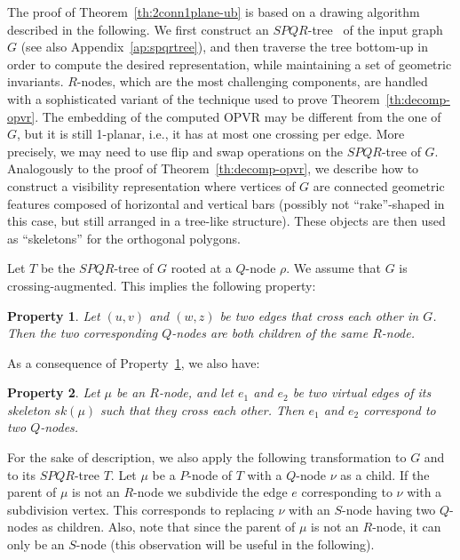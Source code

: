 \documentclass{article}
\newtheorem{property}{Property}
\newcommand{\opvr}{OPVR\xspace}
\begin{document}
The proof of Theorem~\ref{th:2conn1plane-ub} is based on a drawing algorithm described in the following. We first construct an $SPQR$-tree~\cite{DBLP:journals/siamcomp/BattistaT96} of the input graph $G$ (see also Appendix~\ref{ap:spqrtree}), and then traverse  the tree bottom-up in order to compute the desired representation, while maintaining a set of geometric invariants. $R$-nodes, which are the most challenging components, are handled with a sophisticated variant of the technique used to prove Theorem~\ref{th:decomp-opvr}. The embedding of the computed \opvr may be different from the one of $G$, but it is still 1-planar, i.e., it has at most one crossing per edge. More precisely, we may need to use flip and swap operations on the $SPQR$-tree of $G$.  Analogously to  the proof of Theorem~\ref{th:decomp-opvr}, we describe how to construct a visibility representation where vertices of $G$ are connected geometric features composed of horizontal and vertical bars (possibly not ``rake''-shaped in this case, but still arranged in a tree-like structure). These objects are then used as ``skeletons'' for the orthogonal polygons.


Let $T$ be the $SPQR$-tree of $G$ rooted at a $Q$-node $\rho$. We assume that $G$ is crossing-augmented. This implies the following property:

\begin{property}\label{pr:crossings-in-rnodes}
Let $(u,v)$ and $(w,z)$ be two edges that cross each other in $G$. Then the two corresponding $Q$-nodes are both children of the same $R$-node.
\end{property}

As a consequence of Property~\ref{pr:crossings-in-rnodes}, we also have:

\begin{property}\label{pr:virtualedges}
Let $\mu$ be an $R$-node, and let $e_1$ and $e_2$ be two virtual edges of its skeleton $sk(\mu)$ such that they cross each other. Then $e_1$ and $e_2$ correspond to two $Q$-nodes.
\end{property}

For the sake of description, we also apply the following transformation to $G$ and to its $SPQR$-tree $T$. Let $\mu$ be a $P$-node of $T$ with a $Q$-node $\nu$ as a child. If the parent of $\mu$ is not an $R$-node we subdivide the edge $e$ corresponding to $\nu$ with a subdivision vertex. This corresponds to replacing $\nu$ with an $S$-node having two $Q$-nodes as children. Also, note that since the parent of $\mu$ is not an $R$-node, it can only be an $S$-node (this observation will be useful in the following).
\end{document}
